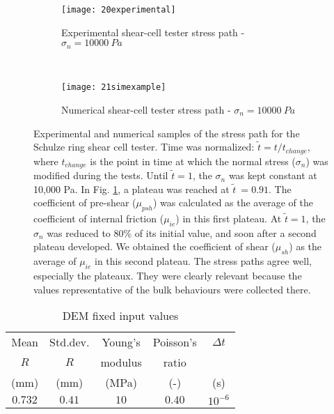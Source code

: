 \documentclass{llncs}
\begin{document}
\begin{figure}[htp] \centering
    \begin{subfigure}[b]{0.96\columnwidth}
        \texttt{[image: 20experimental]}
        \caption{Experimental shear-cell tester stress path - $\sigma_n = 10000
        ~Pa$}
        \label{fig:20experimental} 
    \end{subfigure}\\
        \begin{subfigure}[b]{0.96\columnwidth}
        \texttt{[image: 21simexample]}
        \caption{Numerical shear-cell tester stress path - $\sigma_n = 10000
        ~Pa$}
        \label{fig:21simexample} 
    \end{subfigure}
    \caption[Stress path]{Experimental and numerical samples of the stress path
    for the Schulze ring shear cell tester.
	Time was normalized: $\tilde{t} = t/t_{change}$, where $t_{change}$ is the
	point in time at which the normal stress ($\sigma_n$) was modified during the
	tests.
	Until $\tilde{t}=1$, the $\sigma_n$ was kept constant at 10,000 Pa. 
	In Fig. \ref{fig:20experimental}, 
 	a plateau was reached at $\tilde{t}~=0.91$.
	The coefficient of pre-shear ($\mu_{psh}$) was calculated as the average of the
	coefficient of internal friction ($\mu_{ie}$) in this first plateau.
	At $\tilde{t}=1$, the $\sigma_n$ was reduced to $80 \%$ of its initial
	value, and soon after
	a second plateau developed.
	We obtained the coefficient of
	shear ($ \mu_{sh}$) as the average of $\mu_{ie}$ in this second plateau.
	The stress paths agree well, especially the plateaux.
	They were clearly relevant because
	the values representative of the bulk behaviours 
	were collected there.}
    \label{fig:40experimentalsimulation}
\end{figure}
\begin{table}[h]
\centering
\begin{tabular}{ccccc}
\hline
    Mean & Std.dev.  & Young's & Poisson's & $\Delta t$\\
    $R$ & $R$ & modulus & ratio & \\
    (mm)  & (mm)  & (MPa) & (-) & (s)\\
    \hline
    $0.732$ & $0.41$ & $10$    & $0.40$ & $10^{-6}$\\
\hline
\end{tabular}
\caption{DEM fixed input values}
\label{tab:09DEMFixedinputvalues}
\end{table}
\end{document}

